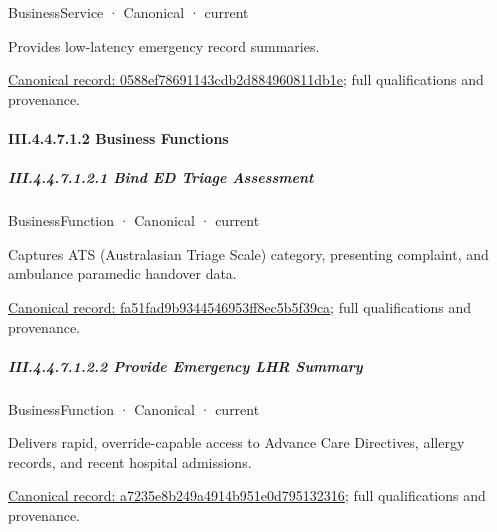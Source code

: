 \label{element:0588ef78691143cdb2d884960811db1e}
{\small BusinessService · Canonical · current}\par

Provides low-latency emergency record summaries.


{\footnotesize \href{../../../../../../../continuum/business/business-service/0588ef78691143cdb2d884960811db1e.md}{Canonical record: 0588ef78691143cdb2d884960811db1e}; full qualifications and provenance.}\par
\paragraph*{III.4.4.7.1.2 Business Functions}
\label{navigation:III.4.4.7.1.2}

\subparagraph*{III.4.4.7.1.2.1 Bind ED Triage Assessment}
\label{navigation:III.4.4.7.1.2.1}

\label{element:fa51fad9b9344546953ff8ec5b5f39ca}
{\small BusinessFunction · Canonical · current}\par

Captures ATS (Australasian Triage Scale) category, presenting complaint, and ambulance paramedic handover data.


{\footnotesize \href{../../../../../../../continuum/business/business-function/fa51fad9b9344546953ff8ec5b5f39ca.md}{Canonical record: fa51fad9b9344546953ff8ec5b5f39ca}; full qualifications and provenance.}\par
\subparagraph*{III.4.4.7.1.2.2 Provide Emergency LHR Summary}
\label{navigation:III.4.4.7.1.2.2}

\label{element:a7235e8b249a4914b951e0d795132316}
{\small BusinessFunction · Canonical · current}\par

Delivers rapid, override-capable access to Advance Care Directives, allergy records, and recent hospital admissions.


{\footnotesize \href{../../../../../../../continuum/business/business-function/a7235e8b249a4914b951e0d795132316.md}{Canonical record: a7235e8b249a4914b951e0d795132316}; full qualifications and provenance.}\par
